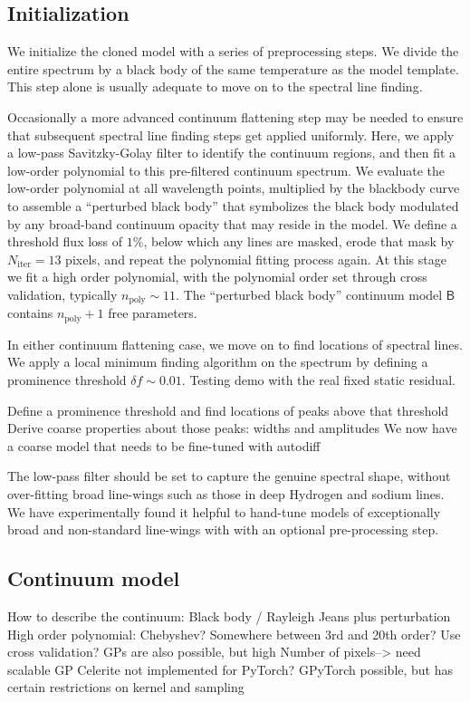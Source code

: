 \documentclass[modern]{aastex631}
\begin{document}
\subsection{Initialization}

We initialize the cloned model with a series of preprocessing steps.  We divide the entire spectrum by a black body of the same temperature as the model template.  This step alone is usually adequate to move on to the spectral line finding.


Occasionally a more advanced continuum flattening step may be needed to ensure that subsequent spectral line finding steps get applied uniformly.  Here, we apply a low-pass Savitzky-Golay filter to identify the continuum regions, and then fit a low-order polynomial to this pre-filtered continuum spectrum.  We evaluate the low-order polynomial at all wavelength points, multiplied by the blackbody curve to assemble a ``perturbed black body'' that symbolizes the black body modulated by any broad-band continuum opacity that may reside in the model.  We define a threshold flux loss of $1\%$, below which any lines are masked, erode that mask by $N_{\mathrm{iter}}=13$ pixels, and repeat the polynomial fitting process again.  At this stage we fit a high order polynomial, with the polynomial order set through cross validation, typically $n_{\mathrm{poly}}\sim11$.  The ``perturbed black body'' continuum model $\mathsf{B}$ contains  $n_{\mathrm{poly}}+1$ free parameters.

In either continuum flattening case, we move on to find locations of spectral lines.
We apply a local minimum finding algorithm on the spectrum by defining a prominence threshold $\delta f\sim0.01$.
Testing demo with the real fixed static residual.


\begin{outline}
  \1 Define a prominence threshold and find locations of peaks above that threshold
  \2 Derive coarse properties about those peaks: widths and amplitudes
  \1 We now have a coarse model that needs to be fine-tuned with autodiff
\end{outline}

The low-pass filter should be set to capture the genuine spectral shape, without over-fitting broad line-wings such as those in deep Hydrogen and sodium lines.  We have experimentally found it helpful to hand-tune models of exceptionally broad and non-standard line-wings with with an optional pre-processing step.

\subsection{Continuum model}
\begin{outline}
  \1 How to describe the continuum:
  \2 Black body / Rayleigh Jeans plus perturbation
  \2 High order polynomial: Chebyshev? Somewhere between 3rd and 20th order?
  \2 Use cross validation?
  \1 GPs are also possible, but high Number of pixels--> need scalable GP
  \2 Celerite not implemented for PyTorch?
  \2 GPyTorch possible, but has certain restrictions on kernel and sampling
\end{outline}
\end{document}
